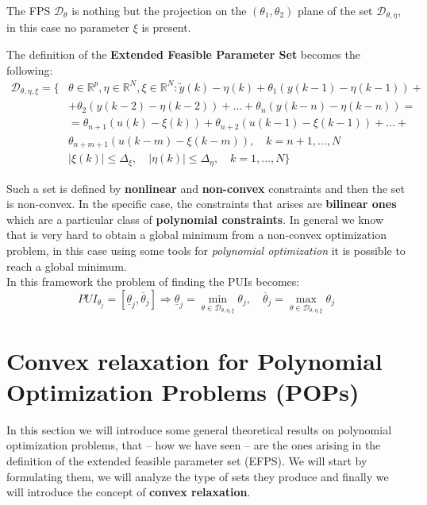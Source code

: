 \noindent
The FPS $\mathcal{D}_\theta$ is nothing but the projection on the $(\theta_1,\theta_2)$ plane of the set $\mathcal{D}_{\theta,\eta}$, in this case no parameter $\xi$ is present.

\noindent
The definition of the \textbf{Extended Feasible Parameter Set} becomes the following:
\begin{equation}
    \begin{aligned}
        \mathcal{D}_{\theta,\eta,\xi} = \{
            &\theta\in\mathbb{R}^p, \eta\in\mathbb{R}^N, \xi \in \mathbb{R}^N: 
            \tilde{y}(k)-\eta(k) + \theta_1 (y(k-1)-\eta(k-1)) +\\
            &+\theta_2 (y(k-2)-\eta(k-2))+\dots+\theta_n (y(k-n)-\eta(k-n))=\\
            &=\theta_{n+1} (u(k)-\xi(k))+\theta_{n+2} (u(k-1)-\xi(k-1)) + ...+\\
            &\theta_{n+m+1} (u(k-m)-\xi(k-m)), \quad k=n+1,...,N\\
             &\vert \xi(k) \vert \le \Delta_\xi, \quad 
            \vert \eta(k) \vert \le \Delta_\eta, \quad k=1,...,N
        \}
    \end{aligned}
\end{equation}

\noindent
Such a set is defined by \textbf{nonlinear} and \textbf{non-convex} constraints and then the set is non-convex. In the specific case, the constraints that arises are \textbf{bilinear ones} which are a particular class of \textbf{polynomial constraints}. In general we know that is very hard to obtain a global minimum from a non-convex optimization problem, in this case using some tools for \textit{polynomial optimization} it is possible to reach a global minimum.\\

\noindent
In this framework the problem of finding the PUIs becomes:
{\large{
    \begin{equation}\label{eq:PUI_delta}
        PUI_{\theta_j} = [\underline{\theta}_j,\overline{\theta}_j] \Longrightarrow 
        \underline{\theta}_j = \min_{\theta\in\mathcal{D}_{\theta,\eta,\xi} } \theta_j,    \quad
        \overline{\theta}_j = \max_{\theta\in\mathcal{D}_{\theta,\eta,\xi}} \theta_j
    \end{equation}
}}

\section{Convex relaxation for Polynomial Optimization Problems (POPs)}
\begin{center}
    \textsf{
    In this section we will introduce some general theoretical results on polynomial optimization problems, that -- how we have seen -- are the ones arising in the definition of the extended feasible parameter set (EFPS). We will start by formulating them, we will analyze the type of sets they produce and finally we will introduce the concept of \textbf{convex relaxation}.}
\end{center}

